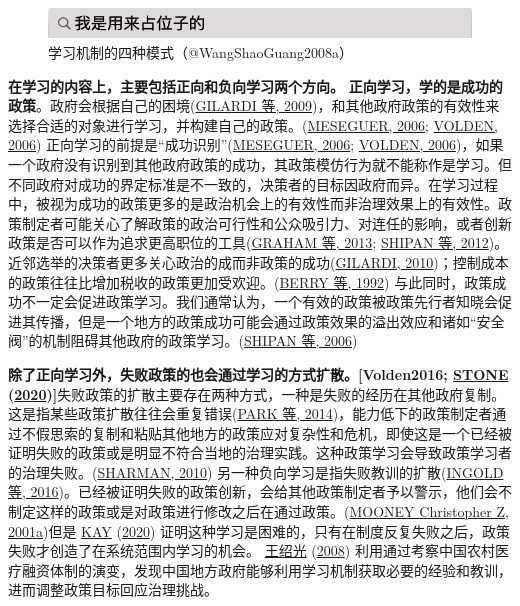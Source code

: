 \documentclass[
  12pt,
]{ctexart}
\begin{document}
\begin{figure}
\includegraphics[width=1\linewidth]{../figures/占位子的图} \caption{学习机制的四种模式（@WangShaoGuang2008a）}\label{fig:unnamed-chunk-2}
\end{figure}

\textbf{在学习的内容上，主要包括正向和负向学习两个方向。}
\textbf{正向学习，学的是成功的政策}。政府会根据自己的困境(\protect\hyperlink{ref-GilardiEtAl2009}{GILARDI 等, 2009})，和其他政府政策的有效性来选择合适的对象进行学习，并构建自己的政策。(\protect\hyperlink{ref-Meseguer2006}{MESEGUER, 2006}; \protect\hyperlink{ref-Volden2006}{VOLDEN, 2006})
正向学习的前提是``成功识别''(\protect\hyperlink{ref-Meseguer2006}{MESEGUER, 2006}; \protect\hyperlink{ref-Volden2006}{VOLDEN, 2006})，如果一个政府没有识别到其他政府政策的成功，其政策模仿行为就不能称作是学习。但不同政府对成功的界定标准是不一致的，决策者的目标因政府而异。在学习过程中，被视为成功的政策更多的是政治机会上的有效性而非治理效果上的有效性。政策制定者可能关心了解政策的政治可行性和公众吸引力、对连任的影响，或者创新政策是否可以作为追求更高职位的工具(\protect\hyperlink{ref-GrahamEtAl2013}{GRAHAM 等, 2013}; \protect\hyperlink{ref-ShipanVolden2012}{SHIPAN 等, 2012})。近邻选举的决策者更多关心政治的成而非政策的成功(\protect\hyperlink{ref-Gilardi2010b}{GILARDI, 2010})；控制成本的政策往往比增加税收的政策更加受欢迎。(\protect\hyperlink{ref-BerryBerry1992}{BERRY 等, 1992})
与此同时，政策成功不一定会促进政策学习。我们通常认为，一个有效的政策被政策先行者知晓会促进其传播，但是一个地方的政策成功可能会通过政策效果的溢出效应和诸如``安全阀''的机制阻碍其他政府的政策学习。(\protect\hyperlink{ref-ShipanVolden2006}{SHIPAN 等, 2006})

\textbf{除了正向学习外，失败政策的也会通过学习的方式扩散。{[}Volden2016; \protect\hyperlink{ref-Stone2020}{STONE} (\protect\hyperlink{ref-Stone2020}{2020}){]}}失败政策的扩散主要存在两种方式，一种是失败的经历在其他政府复制。这是指某些政策扩散往往会重复错误(\protect\hyperlink{ref-ParkBerry2014}{PARK 等, 2014})，能力低下的政策制定者通过不假思索的复制和粘贴其他地方的政策应对复杂性和危机，即使这是一个已经被证明失败的政策或是明显不符合当地的治理实践。这种政策学习会导致政策学习者的治理失败。(\protect\hyperlink{ref-Sharman2010}{SHARMAN, 2010})
另一种负向学习是指失败教训的扩散(\protect\hyperlink{ref-IngoldMonaghan2016}{INGOLD 等, 2016})。已经被证明失败的政策创新，会给其他政策制定者予以警示，他们会不制定这样的政策或是对政策进行修改之后在通过政策。(\protect\hyperlink{ref-Mooney2001}{MOONEY Christopher Z, 2001a})但是 \protect\hyperlink{ref-Kay2020}{KAY} (\protect\hyperlink{ref-Kay2020}{2020}) 证明这种学习是困难的，只有在制度反复失败之后，政策失败才创造了在系统范围内学习的机会。 \protect\hyperlink{ref-WangShaoGuang2008a}{王绍光} (\protect\hyperlink{ref-WangShaoGuang2008a}{2008}) 利用通过考察中国农村医疗融资体制的演变，发现中国地方政府能够利用学习机制获取必要的经验和教训，进而调整政策目标回应治理挑战。
\end{document}
